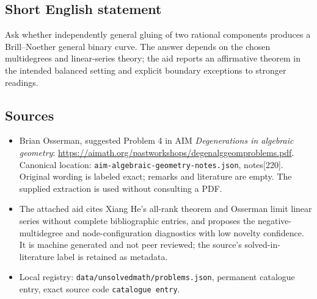 \documentclass[11pt]{article}
\begin{document}
\subsection{Short English statement}
Ask whether independently general gluing of two rational components produces a Brill--Noether general binary curve. The answer depends on the chosen multidegrees and linear-series theory; the aid reports an affirmative theorem in the intended balanced setting and explicit boundary exceptions to stronger readings.
\subsection{Sources}
\begin{itemize}
\item Brian Osserman, suggested Problem 4 in AIM \emph{Degenerations in algebraic geometry}: \url{https://aimath.org/pastworkshops/degenalggeomproblems.pdf}. Canonical location: \texttt{aim-algebraic-geometry-notes.json}, notes[220]. Original wording is labeled exact; remarks and literature are empty. The supplied extraction is used without consulting a PDF.
\item The attached aid cites Xiang He's all-rank theorem and Osserman limit linear series without complete bibliographic entries, and proposes the negative-multidegree and node-configuration diagnostics with low novelty confidence. It is machine generated and not peer reviewed; the source's solved-in-literature label is retained as metadata.
\item Local registry: \texttt{data/unsolvedmath/problems.json}, permanent catalogue entry, exact source code \texttt{catalogue entry}.
\end{itemize}
\end{document}
